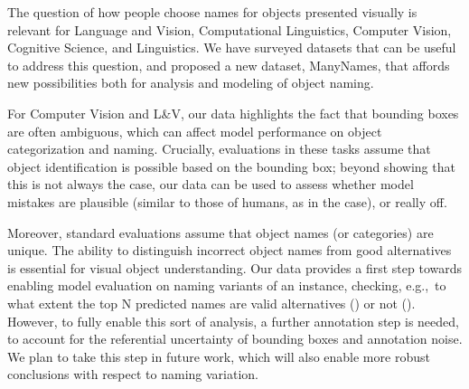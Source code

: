 
The question of how people choose names for objects presented visually is relevant for Language and Vision, Computational Linguistics, Computer Vision, Cognitive Science, and Linguistics.
We have surveyed datasets that can be useful to address this question, and proposed a new dataset, ManyNames, that affords new possibilities both for analysis and modeling of object naming.

For Computer Vision and L\&V, our data highlights the fact that bounding boxes are often ambiguous, which can affect model performance on object categorization and naming.
Crucially, evaluations in these tasks assume that object identification is possible based on the bounding box; beyond showing that this is not always the case, our data can be used to assess whether model mistakes are plausible (similar to those of humans, as in the  case), or really off.

Moreover, standard evaluations assume that object names (or categories) are unique.
The ability to distinguish incorrect object names from good alternatives is essential for visual object understanding.
Our data provides a first step towards enabling model evaluation on naming variants of an instance, checking, e.g.,\ to what extent the top N predicted names are valid alternatives () or not ().
However, to fully enable this sort of analysis, a further annotation step is needed, to account for the referential uncertainty of bounding boxes and annotation noise.
We plan to take this step in future work, which will also enable more robust conclusions with respect to naming variation.

